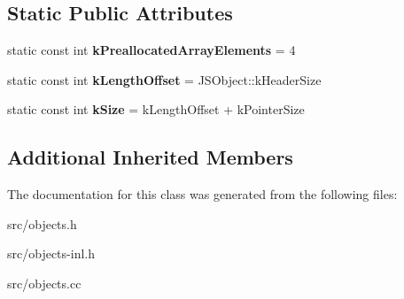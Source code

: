 \subsection*{Static Public Attributes}
\begin{DoxyCompactItemize}
\item 
\hypertarget{classv8_1_1internal_1_1_j_s_array_a67bc60ae3f9c63e64f3b8cc94d718bc0}{}static const int {\bfseries k\+Preallocated\+Array\+Elements} = 4\label{classv8_1_1internal_1_1_j_s_array_a67bc60ae3f9c63e64f3b8cc94d718bc0}

\item 
\hypertarget{classv8_1_1internal_1_1_j_s_array_aea530131fca7e137fdd66ad7215a8352}{}static const int {\bfseries k\+Length\+Offset} = J\+S\+Object\+::k\+Header\+Size\label{classv8_1_1internal_1_1_j_s_array_aea530131fca7e137fdd66ad7215a8352}

\item 
\hypertarget{classv8_1_1internal_1_1_j_s_array_ab3779f1079b0ff1ef3ba3ae3fa226ba0}{}static const int {\bfseries k\+Size} = k\+Length\+Offset + k\+Pointer\+Size\label{classv8_1_1internal_1_1_j_s_array_ab3779f1079b0ff1ef3ba3ae3fa226ba0}

\end{DoxyCompactItemize}
\subsection*{Additional Inherited Members}


The documentation for this class was generated from the following files\+:\begin{DoxyCompactItemize}
\item 
src/objects.\+h\item 
src/objects-\/inl.\+h\item 
src/objects.\+cc\end{DoxyCompactItemize}
